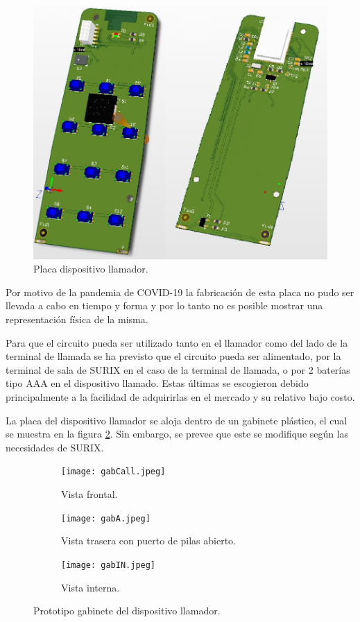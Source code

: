 \begin{figure}[htpb]
	\centering
	\includegraphics[scale=0.4]{./Figures/placas.jpeg}
	\caption{Placa dispositivo llamador.}
	\label{fig:pcb}
\end{figure}

Por motivo de la pandemia de COVID-19 la fabricación de esta placa no pudo ser llevada a cabo en tiempo y forma y por lo tanto no es posible mostrar una representación física de la misma.

Para que el circuito pueda ser utilizado tanto en el llamador como del lado de la terminal de llamada se ha previsto que el circuito pueda ser alimentado, por la terminal de sala de SURIX en el caso de la terminal de llamada, o por 2 baterías tipo AAA en el dispositivo llamado. Estas últimas se escogieron debido principalmente a la facilidad de adquirirlas en el mercado y su relativo bajo costo.

La placa del dispositivo llamador se aloja dentro de un gabinete plástico, el cual se muestra en la figura \ref{fig:gabinete}. Sin embargo, se prevee que este se modifique según las necesidades de SURIX.

\begin{figure}[htpb]
	\centering
   	\begin{subfigure}[b]{0.3\textwidth}
   		\centering
      	\texttt{[image: gabCall.jpeg]}
      	\caption{Vista frontal.}
   	\end{subfigure}%
   	\begin{subfigure}[b]{0.3\textwidth}
   		\centering
      	\texttt{[image: gabA.jpeg]}
      	\caption{Vista trasera con puerto de pilas abierto.}
   	\end{subfigure}%
   	\begin{subfigure}[b]{0.3\textwidth}
   		\centering
      	\texttt{[image: gabIN.jpeg]}
      	\caption{Vista interna.}
   	\end{subfigure}%
	\caption{Prototipo gabinete del dispositivo llamador.}
	\label{fig:gabinete}
\end{figure}

